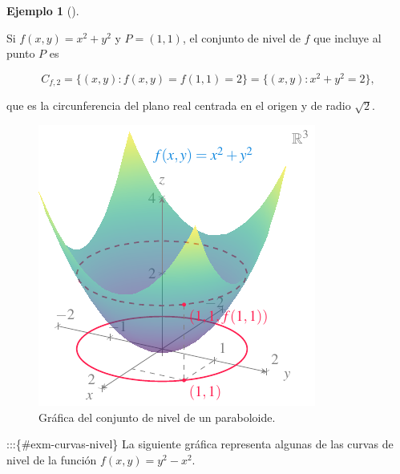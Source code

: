 \documentclass[
  a4paper,
]{scrreport}
\theoremstyle{definition}
\theoremstyle{plain}
\theoremstyle{plain}
\theoremstyle{definition}
\theoremstyle{definition}
\newtheorem{example}{Ejemplo}[chapter]
\theoremstyle{plain}
\theoremstyle{remark}
\begin{document}
\begin{example}[]\protect\hypertarget{exm-conjunto-nivel}{}\label{exm-conjunto-nivel}

Si \(f(x,y)=x^2+y^2\) y \(P=(1,1)\), el conjunto de nivel de \(f\) que
incluye al punto \(P\) es

\[
C_{f,2} = \{(x,y): f(x,y)=f(1,1)=2\} = \{(x,y): x^2+y^2=2\},
\]

que es la circunferencia del plano real centrada en el origen y de radio
\(\sqrt{2}\).

\begin{figure}

{\centering \includegraphics{img/derivadas-funciones-varias-variables/curva-nivel.pdf}

}

\caption{Gráfica del conjunto de nivel de un paraboloide.}

\end{figure}

\end{example}

:::\{\#exm-curvas-nivel\} La siguiente gráfica representa algunas de las
curvas de nivel de la función \(f(x,y) = y^2-x^2\).
\end{document}
